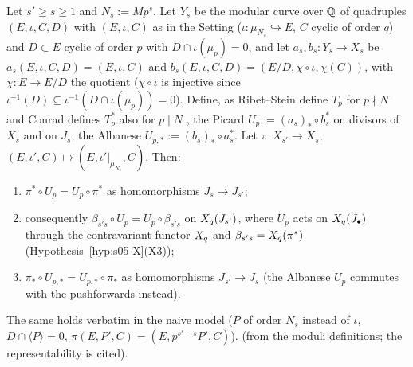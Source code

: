 \begin{lemma}\label{lem:s05-Up-pullback}
Let $s'\ge s\ge1$ and $N_s:=Mp^s$. Let $Y_s$ be the modular curve over $\mathbb{Q}$ of quadruples $(E,\iota,C,D)$ with $(E,\iota,C)$ as in the Setting
($\iota:\mu_{N_s}\hookrightarrow E$, $C$ cyclic of order $q$) and $D\subset E$ cyclic of order $p$ with $D\cap\iota(\mu_p)=0$, and let
$a_s,b_s:Y_s\to X_s$ be $a_s(E,\iota,C,D)=(E,\iota,C)$ and $b_s(E,\iota,C,D)=(E/D,\chi\circ\iota,\chi(C))$, with $\chi:E\to E/D$ the quotient
($\chi\circ\iota$ is injective since $\iota^{-1}(D)\subseteq\iota^{-1}(D\cap\iota(\mu_p))=0$). Define, as Ribet--Stein define $T_p$ for $p\nmid N$
 and Conrad defines $T_p^*$ also for $p\mid N$
, the Picard
$U_p:=(a_s)_*\circ b_s^*$ on divisors of $X_s$ and on $J_s$; the Albanese $U_{p,*}:=(b_s)_*\circ a_s^*$. Let $\pi:X_{s'}\to X_s$,
$(E,\iota',C)\mapsto(E,\iota'|_{\mu_{N_s}},C)$. Then:
\begin{enumerate}[label=(\alph*)]
\item $\pi^*\circ U_p=U_p\circ\pi^*$ as homomorphisms $J_s\to J_{s'}$;
\item consequently $\beta_{s's}\circ U_p=U_p\circ\beta_{s's}$ on $X_q(J_{s'})$, where $U_p$ acts on $X_q(J_\bullet)$ through the contravariant functor
  $X_q$ and $\beta_{s's}=X_q(\pi^*)$ (Hypothesis~\ref{hyp:s05-X}(X3));
\item $\pi_*\circ U_{p,*}=U_{p,*}\circ\pi_*$ as homomorphisms $J_{s'}\to J_s$ (the Albanese $U_p$ commutes with the pushforwards instead).
\end{enumerate}
The same holds verbatim in the naive model ($P$ of order $N_s$ instead of $\iota$, $D\cap\langle P\rangle=0$, $\pi(E,P',C)=(E,p^{s'-s}P',C)$).
\stpmc{} (from the moduli definitions; the representability is cited).
\end{lemma}
